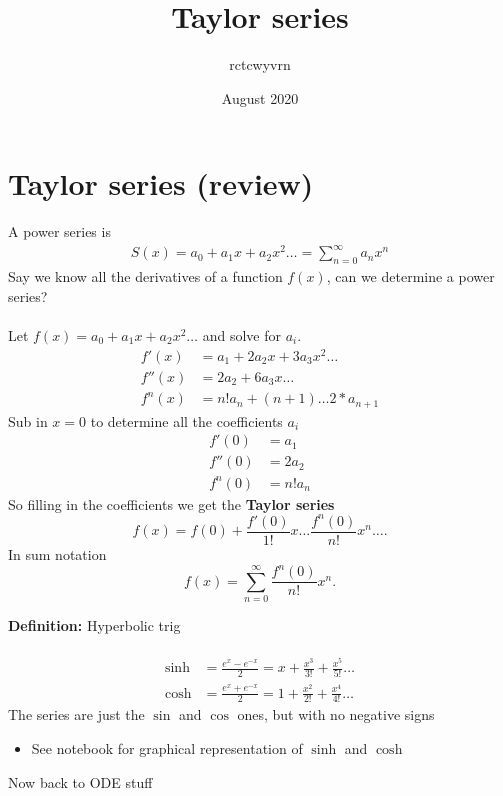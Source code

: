 \documentclass{article}
\title{Taylor series}
\author{rctcwyvrn}
\date{August 2020}
\begin{document}
\maketitle

\section{Taylor series (review)}
A power series is
\begin{align}
	S(x) = a_0 + a_1x + a_2x^2 \ldots = \sum_{n=0}^{\infty} a_nx^n
\end{align}
Say we know all the derivatives of a function $f(x)$, can we determine a power series? \\
~\\
Let $f(x) = a_0 + a_1x + a_2x^2 \ldots$ and solve for $a_i$.
\begin{align}
	f'(x) &= a_1 + 2a_2x + 3a_3x^2 \ldots \\
	f''(x) &= 2a_2 + 6a_3x \ldots  \\
	f^{n}(x) &= n!a_n + (n+1) \ldots 2 * a_{n+1}
\end{align}
Sub in $x=0$ to determine all the coefficients $a_i$
\begin{align}
	f'(0) &= a_1 \\ 
	f''(0) &= 2a_2 \\
	f^{n}(0) &= n!a_n 
\end{align}
So filling in the coefficients we get the {\color{blue} \textbf{Taylor series}}
\[
	f(x) = f(0) + \frac{f'(0)}{1!}x \ldots \frac{f^{n}(0)}{n!}x^n \ldots
.\] 
In sum notation
\[
	f(x) = \sum_{n=0}^{\infty} \frac{f^{n}(0)}{n!}x^n 
.\]
\begin{definition} 
\textbf{Definition:} Hyperbolic trig \\
~\\
\begin{align}
	\sinh &= \frac{e^x - e^{-x}}{2} = x + \frac{x^3}{3!} + \frac{x^5}{5!} \ldots \\
	\cosh &= \frac{e^x + e^{-x}}{2} = 1 + \frac{x^2}{2!} + \frac{x^4}{4!} \ldots 
\end{align}
The series are just the $\sin$ and $\cos$ ones, but with no negative signs
\begin{itemize}
	\item See notebook for graphical representation of $\sinh$ and $\cosh$
\end{itemize}
\end{definition}
Now back to ODE stuff
\end{document}
